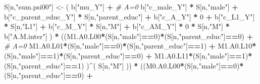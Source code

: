 \documentclass[
]{book}
\newenvironment{Shaded}{\begin{snugshade}}{\end{snugshade}}
\newcommand{\CommentTok}[1]{\textcolor[rgb]{0.56,0.35,0.01}{\textit{#1}}}
\newcommand{\DecValTok}[1]{\textcolor[rgb]{0.00,0.00,0.81}{#1}}
\newcommand{\NormalTok}[1]{#1}
\newcommand{\OtherTok}[1]{\textcolor[rgb]{0.56,0.35,0.01}{#1}}
\newcommand{\SpecialCharTok}[1]{\textcolor[rgb]{0.81,0.36,0.00}{\textbf{#1}}}
\newcommand{\StringTok}[1]{\textcolor[rgb]{0.31,0.60,0.02}{#1}}
\begin{document}
\begin{Shaded}
\begin{Highlighting}[]
\NormalTok{    S[n,}\StringTok{"sum.psi00"}\NormalTok{] }\OtherTok{\textless{}{-}}\NormalTok{  ( b[}\StringTok{"mu\_Y"}\NormalTok{] }\SpecialCharTok{+}                                          \CommentTok{\# A=0}
\NormalTok{                             b[}\StringTok{"c\_male\_Y"}\NormalTok{] }\SpecialCharTok{*}\NormalTok{ S[n,}\StringTok{"male"}\NormalTok{] }\SpecialCharTok{+} 
\NormalTok{                             b[}\StringTok{"c\_parent\_educ\_Y"}\NormalTok{] }\SpecialCharTok{*}\NormalTok{ S[n,}\StringTok{"parent\_educ"}\NormalTok{] }\SpecialCharTok{+} 
\NormalTok{                             b[}\StringTok{"c\_A\_Y"}\NormalTok{] }\SpecialCharTok{*} \DecValTok{0} \SpecialCharTok{+} 
\NormalTok{                             b[}\StringTok{"c\_L1\_Y"}\NormalTok{] }\SpecialCharTok{*}\NormalTok{ S[n,}\StringTok{"L1"}\NormalTok{] }\SpecialCharTok{+}
\NormalTok{                             b[}\StringTok{"c\_M\_Y"}\NormalTok{] }\SpecialCharTok{*}\NormalTok{ S[n,}\StringTok{"M"}\NormalTok{] }\SpecialCharTok{+}
\NormalTok{                             b[}\StringTok{"c\_AM\_Y"}\NormalTok{] }\SpecialCharTok{*} \DecValTok{0} \SpecialCharTok{*}\NormalTok{ S[n,}\StringTok{"M"}\NormalTok{] }\SpecialCharTok{*}\NormalTok{ b[}\StringTok{"A.M.inter"}\NormalTok{] ) }\SpecialCharTok{*}
\NormalTok{      ((M1.A0.L00}\SpecialCharTok{*}\NormalTok{(S[n,}\StringTok{"male"}\NormalTok{]}\SpecialCharTok{==}\DecValTok{0}\NormalTok{)}\SpecialCharTok{*}\NormalTok{(S[n,}\StringTok{"parent\_educ"}\NormalTok{]}\SpecialCharTok{==}\DecValTok{0}\NormalTok{) }\SpecialCharTok{+}                    \CommentTok{\# A\textquotesingle{}=0}
\NormalTok{          M1.A0.L01}\SpecialCharTok{*}\NormalTok{(S[n,}\StringTok{"male"}\NormalTok{]}\SpecialCharTok{==}\DecValTok{0}\NormalTok{)}\SpecialCharTok{*}\NormalTok{(S[n,}\StringTok{"parent\_educ"}\NormalTok{]}\SpecialCharTok{==}\DecValTok{1}\NormalTok{) }\SpecialCharTok{+}
\NormalTok{          M1.A0.L10}\SpecialCharTok{*}\NormalTok{(S[n,}\StringTok{"male"}\NormalTok{]}\SpecialCharTok{==}\DecValTok{1}\NormalTok{)}\SpecialCharTok{*}\NormalTok{(S[n,}\StringTok{"parent\_educ"}\NormalTok{]}\SpecialCharTok{==}\DecValTok{0}\NormalTok{) }\SpecialCharTok{+} 
\NormalTok{          M1.A0.L11}\SpecialCharTok{*}\NormalTok{(S[n,}\StringTok{"male"}\NormalTok{]}\SpecialCharTok{==}\DecValTok{1}\NormalTok{)}\SpecialCharTok{*}\NormalTok{(S[n,}\StringTok{"parent\_educ"}\NormalTok{]}\SpecialCharTok{==}\DecValTok{1}\NormalTok{) )}\SpecialCharTok{\^{}}\NormalTok{( S[n,}\StringTok{"M"}\NormalTok{] )) }\SpecialCharTok{*}
\NormalTok{      ((M0.A0.L00}\SpecialCharTok{*}\NormalTok{(S[n,}\StringTok{"male"}\NormalTok{]}\SpecialCharTok{==}\DecValTok{0}\NormalTok{)}\SpecialCharTok{*}\NormalTok{(S[n,}\StringTok{"parent\_educ"}\NormalTok{]}\SpecialCharTok{==}\DecValTok{0}\NormalTok{) }\SpecialCharTok{+}                

\end{Highlighting}
\end{Shaded}
\end{document}
